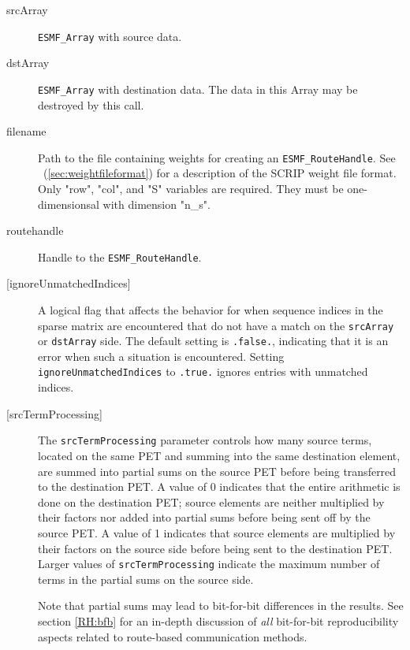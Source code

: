   \begin{description}
  
   \item [srcArray]
       {\tt ESMF\_Array} with source data.
  
   \item [dstArray]
         {\tt ESMF\_Array} with destination data. The data in this Array may be
         destroyed by this call.
  
   \item [filename]
         Path to the file containing weights for creating an {\tt ESMF\_RouteHandle}.
         See ~(\ref{sec:weightfileformat}) for a description of the SCRIP weight
         file format. Only "row", "col", and "S" variables are required. They
         must be one-dimensionsal with dimension "n\_s".
  
   \item [routehandle]
         Handle to the {\tt ESMF\_RouteHandle}.
  
     \item [{[ignoreUnmatchedIndices]}]
       A logical flag that affects the behavior for when sequence indices
       in the sparse matrix are encountered that do not have a match on the
       {\tt srcArray} or {\tt dstArray} side. The default setting is
       {\tt .false.}, indicating that it is an error when such a situation is
       encountered. Setting {\tt ignoreUnmatchedIndices} to {\tt .true.} ignores
       entries with unmatched indices.
  
     \item [{[srcTermProcessing]}]
       The {\tt srcTermProcessing} parameter controls how many source terms,
       located on the same PET and summing into the same destination element,
       are summed into partial sums on the source PET before being transferred
       to the destination PET. A value of 0 indicates that the entire arithmetic
       is done on the destination PET; source elements are neither multiplied
       by their factors nor added into partial sums before being sent off by the
       source PET. A value of 1 indicates that source elements are multiplied
       by their factors on the source side before being sent to the destination
       PET. Larger values of {\tt srcTermProcessing} indicate the maximum number
       of terms in the partial sums on the source side.
  
       Note that partial sums may lead to bit-for-bit differences in the results.
       See section \ref{RH:bfb} for an in-depth discussion of {\em all}
       bit-for-bit reproducibility aspects related to route-based communication
       methods.
  

\end{description}
